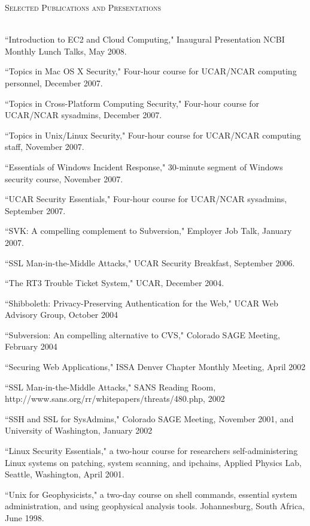 \documentclass{article}
\newcommand{\lineunder}{\vspace*{-8pt} \\ \hspace*{-18pt} \hrulefill \\}
\newcommand{\header}[1]{{\hspace*{-15pt}\vspace*{6pt} \textsc{#1}} \vspace*{-6pt} \lineunder}
\newenvironment{achievements}{\begin{list}{\topsep 0pt \itemsep -2pt}} {\vspace*{4pt}\end{list}}
\begin{document}
\header{Selected Publications and Presentations}
\begin{achievements}
\item ``Introduction to EC2 and Cloud Computing," Inaugural Presentation NCBI Monthly Lunch Talks, May 2008.
\item ``Topics in Mac OS X Security," Four-hour course for UCAR/NCAR computing personnel, December 2007.
\item ``Topics in Cross-Platform Computing Security," Four-hour course for UCAR/NCAR sysadmins, December 2007.  
\item ``Topics in Unix/Linux Security," Four-hour course for UCAR/NCAR computing staff, November 2007.
\item ``Essentials of Windows Incident Response," 30-minute segment of Windows security course, November 2007.
\item ``UCAR Security Essentials,"  Four-hour course for UCAR/NCAR sysadmins, September 2007.
\item ``SVK: A compelling complement to Subversion," Employer Job Talk, January 2007.
\item ``SSL Man-in-the-Middle Attacks," UCAR Security Breakfast, September 2006.
\item ``The RT3 Trouble Ticket System," UCAR, December 2004.  
\item ``Shibboleth: Privacy-Preserving Authentication for the Web," UCAR Web Advisory Group, October 2004
\item ``Subversion: An compelling alternative to CVS," Colorado SAGE Meeting, February 2004
\item ``Securing Web Applications," ISSA Denver Chapter Monthly Meeting, April 2002
\item ``SSL Man-in-the-Middle Attacks," SANS Reading Room, http://www.sans.org/rr/whitepapers/threats/480.php, 2002
\item ``SSH and SSL for SysAdmins," Colorado SAGE Meeting, November 2001, and University of Washington, January 2002
\item ``Linux Security Essentials," a two-hour course for researchers self-administering Linux systems on patching, system scanning, and ipchains,  Applied Physics Lab, Seattle, Washington, April 2001.
\item ``Unix for Geophysicists," a two-day course on shell commands, essential system administration, and using geophysical analysis tools.  Johannesburg, South Africa, June 1998.
\end{achievements}
\end{document}
